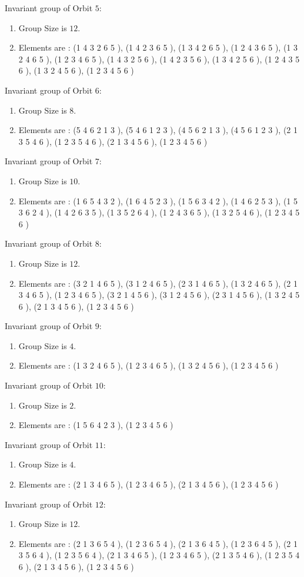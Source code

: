 \documentclass[12pt]{article}
\begin{document}
Invariant group of Orbit $5$:
\begin{enumerate}
\item Group Size is $12$.
\item Elements are : (1 4 3 2 6 5  ), (1 4 2 3 6 5  ), (1 3 4 2 6 5  ), (1 2 4 3 6 5  ), (1 3 2 4 6 5  ), (1 2 3 4 6 5  ), (1 4 3 2 5 6  ), (1 4 2 3 5 6  ), (1 3 4 2 5 6  ), (1 2 4 3 5 6  ), (1 3 2 4 5 6  ), (1 2 3 4 5 6  )
\end{enumerate}
Invariant group of Orbit $6$:
\begin{enumerate}
\item Group Size is $8$.
\item Elements are : (5 4 6 2 1 3  ), (5 4 6 1 2 3  ), (4 5 6 2 1 3  ), (4 5 6 1 2 3  ), (2 1 3 5 4 6  ), (1 2 3 5 4 6  ), (2 1 3 4 5 6  ), (1 2 3 4 5 6  )
\end{enumerate}
Invariant group of Orbit $7$:
\begin{enumerate}
\item Group Size is $10$.
\item Elements are : (1 6 5 4 3 2  ), (1 6 4 5 2 3  ), (1 5 6 3 4 2  ), (1 4 6 2 5 3  ), (1 5 3 6 2 4  ), (1 4 2 6 3 5  ), (1 3 5 2 6 4  ), (1 2 4 3 6 5  ), (1 3 2 5 4 6  ), (1 2 3 4 5 6  )
\end{enumerate}
Invariant group of Orbit $8$:
\begin{enumerate}
\item Group Size is $12$.
\item Elements are : (3 2 1 4 6 5  ), (3 1 2 4 6 5  ), (2 3 1 4 6 5  ), (1 3 2 4 6 5  ), (2 1 3 4 6 5  ), (1 2 3 4 6 5  ), (3 2 1 4 5 6  ), (3 1 2 4 5 6  ), (2 3 1 4 5 6  ), (1 3 2 4 5 6  ), (2 1 3 4 5 6  ), (1 2 3 4 5 6  )
\end{enumerate}
Invariant group of Orbit $9$:
\begin{enumerate}
\item Group Size is $4$.
\item Elements are : (1 3 2 4 6 5  ), (1 2 3 4 6 5  ), (1 3 2 4 5 6  ), (1 2 3 4 5 6  )
\end{enumerate}
Invariant group of Orbit $10$:
\begin{enumerate}
\item Group Size is $2$.
\item Elements are : (1 5 6 4 2 3  ), (1 2 3 4 5 6  )
\end{enumerate}
Invariant group of Orbit $11$:
\begin{enumerate}
\item Group Size is $4$.
\item Elements are : (2 1 3 4 6 5  ), (1 2 3 4 6 5  ), (2 1 3 4 5 6  ), (1 2 3 4 5 6  )
\end{enumerate}
Invariant group of Orbit $12$:
\begin{enumerate}
\item Group Size is $12$.
\item Elements are : (2 1 3 6 5 4  ), (1 2 3 6 5 4  ), (2 1 3 6 4 5  ), (1 2 3 6 4 5  ), (2 1 3 5 6 4  ), (1 2 3 5 6 4  ), (2 1 3 4 6 5  ), (1 2 3 4 6 5  ), (2 1 3 5 4 6  ), (1 2 3 5 4 6  ), (2 1 3 4 5 6  ), (1 2 3 4 5 6  )
\end{enumerate}
\end{document}

